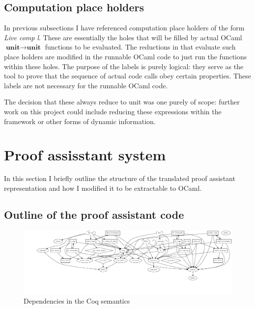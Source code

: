 \documentclass[12pt,twoside,notitlepage]{report}
\begin{document}
\subsection{Computation place holders}
In previous subsections I have referenced computation place holders of the form \textit{Live comp l}. These are essentially the holes that will be filled by actual OCaml $ \textbf{unit} \rightarrow \textbf{unit} $ functions to be evaluated. The reductions in  that evaluate such place holders are modified in the runnable OCaml code to just run the functions within these holes. The purpose of the labels is purely logical: they serve as the tool to prove that the sequence of actual code calls obey certain properties. These labels are not necessary for the runnable OCaml code.

The decision that these always reduce to unit was one purely of scope: further work on this project could include reducing these expressions within the framework or other forms of dynamic information. \clearpage
\section{Proof assisstant system}
In this section I briefly outline the structure of the translated proof assistant representation and how I modified it to be extractable to OCaml. 
\subsection{Outline of the proof assistant code}

\begin{figure}
\centering
\includegraphics[width=\linewidth]{coqBaseStruct.pdf}
\caption{Dependencies in the Coq semantics}
\label{fig:coqBaseStruct}
\end{figure}
\end{document}
